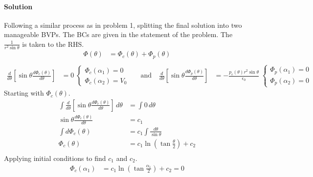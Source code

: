 \documentclass{article}
\begin{document}
{		\paragraph{Solution} Following a similar process as in problem 1, splitting the final solution into two manageable BVPs. The BCs are given in the statement of the problem. The $\tfrac{1}{r^2 \sin \theta}$ is taken to the RHS.
		\begin{equation*}
			\begin{split}
				\Phi(\theta) &= \Phi_c(\theta) + \Phi_p(\theta) \\
			\end{split}
		\end{equation*}
		\begin{equation*}
			\begin{aligned}
				\frac{d}{d\theta} \left[ \sin \theta \frac{d \Phi_c(\theta)}{d\theta} \right] &= 0 \;
				\begin{cases}
					\Phi_c(\alpha_1) = 0 \\
					\Phi_c(\alpha_2) = V_0
				\end{cases} & &\text{and} \; &
				\frac{d}{d\theta} \left[ \sin \theta \frac{d \Phi_p(\theta)}{d\theta} \right] &= -\frac{p_c(\theta) r^2 \sin \theta}{\epsilon_0} \;
				\begin{cases}
					\Phi_p(\alpha_1) = 0 \\
					\Phi_p(\alpha_2) = 0
				\end{cases} 
			\end{aligned}
		\end{equation*}
		Starting with $\Phi_c(\theta)$.
		\begin{equation*}
			\begin{split}
				\int \frac{d}{d\theta} \left[ \sin \theta \frac{d \Phi_c(\theta)}{d\theta} \right] \, d\theta &= \int 0 \, d\theta \\
				\sin \theta \frac{d \Phi_c(\theta)}{d\theta} &= c_1 \\
				\int d\Phi_c(\theta) &= c_1 \int \frac{d\theta}{\sin \theta} \\
				\Phi_c(\theta) &= c_1 \ln(\tan \tfrac{\theta}{2}) + c_2 \\
			\end{split}
		\end{equation*}
		Applying initial conditions to find $c_1$ and $c_2$.
		\begin{equation*}
			\begin{aligned}
				\Phi_c(\alpha_1) &= c_1 \ln(\tan \tfrac{\alpha_1}{2}) + c_2 = 0 \\

\end{aligned}
\end{equation*}}
\end{document}
